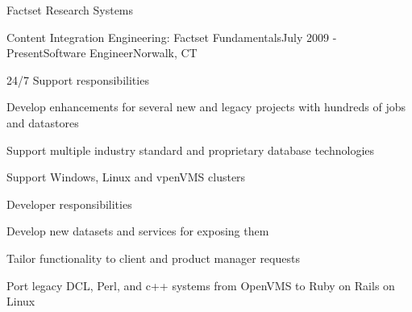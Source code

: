 \documentclass{resume} %
\begin{document}
\begin{rSection}{Factset Research Systems}
\begin{rSubsection}{Content Integration Engineering: Factset Fundamentals}{July 2009 - Present}{Software Engineer}{Norwalk, CT}
\setlength{\itemindent}{1em}
\item 24/7 Support responsibilities 
\setlength{\itemindent}{2em}
\item Develop enhancements for several new and legacy projects with hundreds of jobs and datastores
\item Support multiple industry standard and proprietary database technologies
\item Support Windows, Linux and vpenVMS clusters
\setlength{\itemindent}{1em}
\item Developer responsibilities 
\setlength{\itemindent}{2em}
\item Develop new datasets and services for exposing them 
\item Tailor functionality to client and product manager requests
\item Port legacy DCL, Perl, and c++ systems from OpenVMS to Ruby on Rails on Linux
\end{rSubsection}

\end{rSection}

\end{document}
